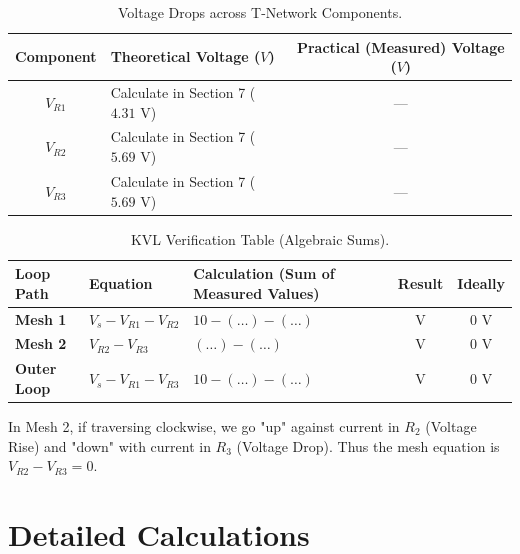\begin{table}[htbp]
\centering
\small
\begin{tabularx}{\textwidth}{c X c}
\toprule
\textbf{Component} & \textbf{Theoretical Voltage ($V$)} & \textbf{Practical (Measured) Voltage ($V$)} \\
\midrule
$V_{R1}$ & Calculate in Section 7 ($4.31\text{ V}$) & — \\
$V_{R2}$ & Calculate in Section 7 ($5.69\text{ V}$) & — \\
$V_{R3}$ & Calculate in Section 7 ($5.69\text{ V}$) & — \\
\bottomrule
\end{tabularx}
\caption{Voltage Drops across T-Network Components.}
\label{tab:kvl-drops}
\end{table}

\begin{table}[htbp]
\centering
\small
\begin{tabularx}{\textwidth}{l p{3.2cm} X c c}
\toprule
\textbf{Loop Path} & \textbf{Equation} & \textbf{Calculation (Sum of Measured Values)} & \textbf{Result} & \textbf{Ideally} \\
\midrule
\textbf{Mesh 1} & $V_s - V_{R1} - V_{R2}$ & $10 - (\dots) - (\dots)$ & \underline{\hspace{1.2cm}} V & $0\text{ V}$ \\
\textbf{Mesh 2} & $V_{R2} - V_{R3}$ & $(\dots) - (\dots)$ & \underline{\hspace{1.2cm}} V & $0\text{ V}$ \\
\textbf{Outer Loop} & $V_s - V_{R1} - V_{R3}$ & $10 - (\dots) - (\dots)$ & \underline{\hspace{1.2cm}} V & $0\text{ V}$ \\
\bottomrule
\end{tabularx}
\caption{KVL Verification Table (Algebraic Sums).}
\label{tab:kvl-sum}
\end{table}

\begin{examtip}
In Mesh 2, if traversing clockwise, we go "up" against current in $R_2$ (Voltage Rise) and "down" with current in $R_3$ (Voltage Drop). Thus the mesh equation is $V_{R2} - V_{R3} = 0$.
\end{examtip}

\section{Detailed Calculations}


